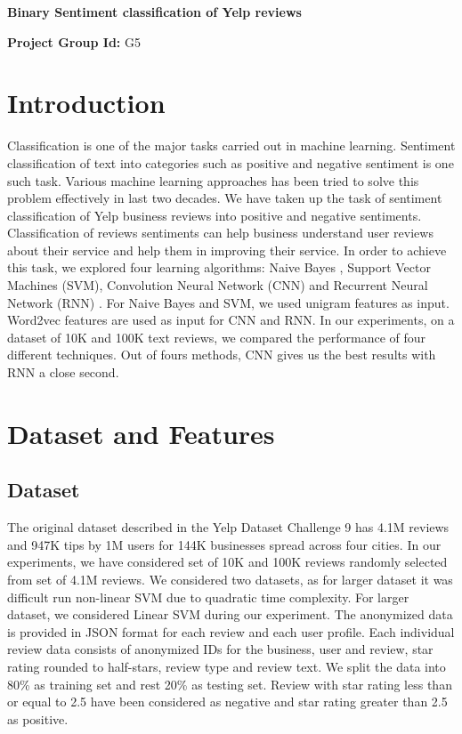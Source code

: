 \documentclass[11pt]{article}
\begin{document}
	\thispagestyle{empty}
	
	
	\centerline{\textbf{\Large{Binary Sentiment classification of Yelp reviews}}}
	
	\bigskip
	
	\textbf{Project Group Id:} 
	G5
	
	\bigskip
	
	\section{Introduction}
	Classification is one of the major tasks carried out in machine learning. Sentiment classification of text into categories such as positive and negative sentiment is one such task. Various machine learning approaches has been tried to solve this problem effectively in last two decades. We have taken up the task of sentiment classification of Yelp business reviews\cite{yelp} into positive and negative sentiments. Classification of reviews sentiments can help business understand user reviews about their service and help them in improving their service. In order to achieve this task, we explored four learning algorithms: Naive Bayes \cite{plv}, Support Vector Machines (SVM)\cite{plv}, Convolution Neural Network (CNN) \cite{kim} and Recurrent Neural Network (RNN) \cite{ydlb}. For Naive Bayes and SVM, we used unigram features as input. Word2vec \cite{w2v1} \cite{w2v2} features are used as input for CNN and RNN. In our experiments, on a dataset of 10K and 100K text reviews, we compared the performance of four different techniques. Out of fours methods, CNN gives us the best results with RNN a close second.
	
	\bigskip
	
	
	\section{Dataset and Features} 
		\subsection{Dataset}
		The original dataset described in the Yelp Dataset Challenge 9 \cite{yelp} has 4.1M reviews and 947K tips by 1M users for 144K businesses spread across four cities. In our experiments, we have considered set of 10K and 100K reviews randomly selected from set of 4.1M reviews. We considered two datasets, as for larger dataset it was difficult run non-linear SVM due to quadratic time complexity. For larger dataset, we considered Linear SVM during our experiment. The anonymized data is provided in JSON format for each review and each user profile. Each individual review data consists of anonymized IDs for the business, user and review, star rating  rounded to half-stars, review type and review text. We split the data into 80\% as training set and rest 20\% as testing set. Review with star rating less than or equal to 2.5 have been considered as negative and star rating greater than 2.5 as positive.   
	
\end{document}
